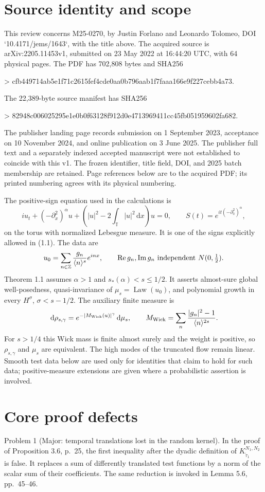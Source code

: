 \documentclass[10pt]{article}
\begin{document}
\section*{Source identity and scope}
This review concerns M25-0270, by Justin Forlano and Leonardo Tolomeo, DOI `10.4171/jems/1643`, with the title above. The acquired source is arXiv:2205.11453v1, submitted on 23 May 2022 at 16:44:20 UTC, with 64 physical pages. The PDF has 702,808 bytes and SHA256\par
> cfb449714ab5e1f71c2615fef4cde0aa0b796aab1f7faaa166e9f227cebb4a73.\par
The 22,389-byte source manifest has SHA256\par
> 82948c006025295e1e0b0f63128f912d0e4713969411cc45fb051959602fa682.\par
The publisher landing page records submission on 1 September 2023, acceptance on 10 November 2024, and online publication on 3 June 2025. The publisher full text and a separately indexed accepted manuscript were not established to coincide with this v1. The frozen identifier, title field, DOI, and 2025 batch membership are retained. Page references below are to the acquired PDF; its printed numbering agrees with its physical numbering.\par
The positive-sign equation used in the calculations is \[iu_t+(-\partial_x^2)^\alpha u+
 \left(|u|^2-2\int_\mathbb T|u|^2\,\mathrm dx\right)u=0,
 \qquad S(t)=e^{it(-\partial_x^2)^\alpha},\] on the torus with normalized Lebesgue measure. It is one of the signs explicitly allowed in (1.1). The data are \[u_0=\sum_{n\in\mathbb Z}\frac{g_n}{\langle n\rangle^s}e^{inx},
 \qquad
 \operatorname{Re}g_n,\operatorname{Im}g_n
 \ \hbox{independent }N(0,\tfrac12).\] Theorem 1.1 assumes \(\alpha>1\) and \(s_*(\alpha)<s\le1/2\). It asserts almost-sure global well-posedness, quasi-invariance of \(\mu_s=\operatorname{Law}(u_0)\), and polynomial growth in every \(H^\sigma\), \(\sigma<s-1/2\). The auxiliary finite measure is \[\,\mathrm d\rho_{s,\gamma}=
 e^{-|M_{\rm Wick}(u)|^\gamma}\,\mathrm d\mu_s,\qquad
 M_{\rm Wick}=\sum_n\frac{|g_n|^2-1}{\langle n\rangle^{2s}}.\] For \(s>1/4\) this Wick mass is finite almost surely and the weight is positive, so \(\rho_{s,\gamma}\) and \(\mu_s\) are equivalent. The high modes of the truncated flow remain linear. Smooth test data below are used only for identities that claim to hold for such data; positive-measure extensions are given where a probabilistic assertion is involved.\par
\section*{Core proof defects}
Problem 1 (Major: temporal translations lost in the random kernel).  In the proof of Proposition 3.6, p. 25, the first inequality after the dyadic definition of \(K_{\tilde\tau_1}^{N_1,N_2}\) is false. It replaces a sum of differently translated test functions by a norm of the scalar sum of their coefficients. The same reduction is invoked in Lemma 5.6, pp. 45–46.\par
\end{document}
